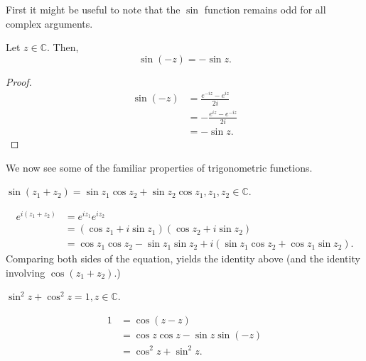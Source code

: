 \documentclass[12pt]{book}
\begin{document}
First it might be useful to note that the $\sin$ function remains odd for all complex arguments.

\begin{thm}
    Let $z \in \mathbb{C}.$ Then,
    \[
        \sin(-z) = -\sin z.
    \]
\end{thm}
\begin{proof}
    \begin{align*}
        \sin(-z)
            &=
                \frac{e^{-iz} - e^{iz}}{2i} \\
            &=
                - \frac{e^{iz} - e^{-iz}}{2i} \\
            &=
                - \sin z.
    \end{align*}
\end{proof}

We now see some of the familiar properties of trigonometric functions.

\begin{exmp}
    $\sin(z_1 + z_ 2) = \sin z_1 \cos z_2 + \sin z_2 \cos z_1, z_1, z_2 \in \mathbb{C}.$
\end{exmp}

\begin{align*}
    e^{i(z_1 + z_2)}
        &=
            e^{iz_1} e^{iz_2} \\
        &=
            (\cos z_1 + i\sin z_1) (\cos z_2 + i\sin z_2) \\
        &=
            \cos z_1 \cos z_2 - \sin z_1 \sin z_2+ i(\sin z_1 \cos z_2 + \cos z_1 \sin z_2).
\end{align*}
Comparing both sides of the equation, yields the identity above (and the identity involving $\cos(z_1 + z_2).$)

\begin{exmp}
    $\sin^{2}z + \cos^{2}z = 1, z \in \mathbb{C}.$
\end{exmp}
\begin{align*}
    1
        &=
            \cos(z - z) \\
        &=
            \cos z \cos z - \sin z \sin (-z) \\
        &=
            \cos^{2}z + \sin^{2}z.
\end{align*}
\end{document}
